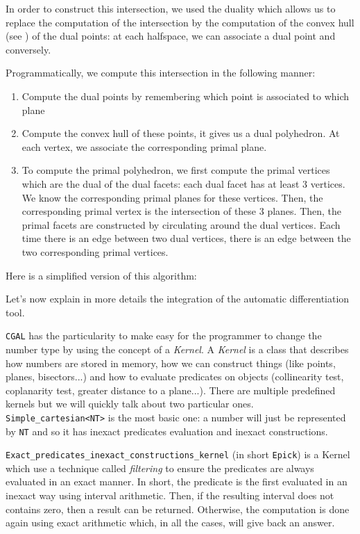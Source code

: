 In order to construct this intersection, we used the duality which allows us to
replace the computation of the intersection by the computation of the convex
hull (see \cite{preparata1979finding}) of the dual points: at each halfspace, we
can associate a dual point and conversely.

Programmatically, we compute this intersection in the following manner:
\begin{enumerate}
    \item Compute the dual points by remembering which point is associated to
        which plane
    \item Compute the convex hull of these points, it gives us a dual
        polyhedron. At each vertex, we associate the corresponding primal plane.
    \item To compute the primal polyhedron, we first compute the primal vertices
        which are the dual of the dual facets: each dual facet has at least 3
        vertices. We know the corresponding primal planes for these vertices.
        Then, the corresponding primal vertex is the intersection of these 3
        planes. Then, the primal facets are constructed by circulating around
        the dual vertices. Each time there is an edge between two dual vertices,
        there is an edge between the two corresponding primal vertices.
\end{enumerate}

Here is a simplified version of this algorithm:


Let's now explain in more details the integration of the automatic
differentiation tool.

\texttt{CGAL} has the particularity to make easy for the programmer to change
the number type by using the concept of a \emph{Kernel}. A \emph{Kernel} is a
class that describes how numbers are stored in memory, how we can construct
things (like points, planes, bisectors...) and how to evaluate predicates on
objects (collinearity test, coplanarity test, greater distance to a plane...).
There are multiple predefined kernels but we will quickly talk about two
particular ones. \texttt{Simple\_cartesian<NT>} is the most basic one: a number
will just be represented by \texttt{NT} and so it has inexact predicates
evaluation and inexact constructions.

\texttt{Exact\_predicates\_inexact\_constructions\_kernel} (in short
\texttt{Epick}) is a Kernel which use a technique called \emph{filtering} to
ensure the predicates are always evaluated in an exact manner. In short, the
predicate is the first evaluated in an inexact way using interval arithmetic.
Then, if the resulting interval does not contains zero, then a result can be
returned. Otherwise, the computation is done again using exact arithmetic which,
in all the cases, will give back an answer.

